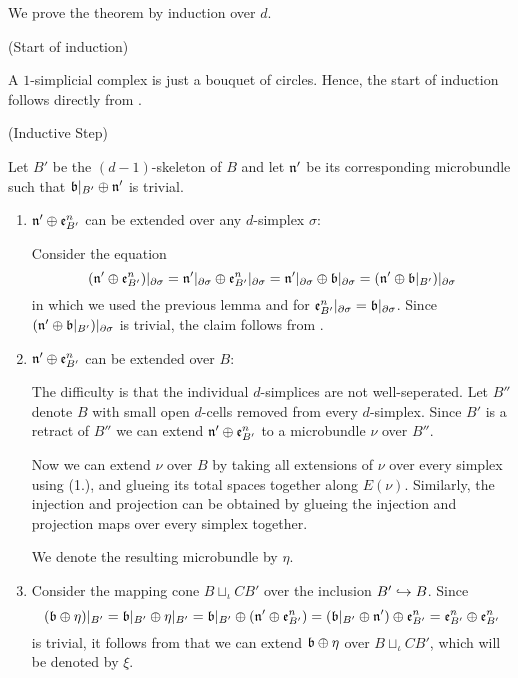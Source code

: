 \begin{myproof}
    We prove the theorem by induction over $d$.

    (Start of induction)

    A $1$-simplicial complex is just a bouquet of circles.
    Hence, the start of induction follows directly from .   

    (Inductive Step)

    Let $B'$ be the $(d - 1)$-skeleton of $B$ and let $\mathfrak{n}'$ be its corresponding microbundle
    such that $\whitney{\bb[B']}{\bn'}$ is trivial.

    \begin{enumerate}
        \item $\mathfrak{n}' \oplus{} \mathfrak{e}^{n}_{B'}$ can be extended over any $d$-simplex $\sigma$:

        Consider the equation
        \[
            (\whitney{\bn'}{\be{B'}})\restr{\partial\sigma}
            = \whitney{\bn'\restr{\partial\sigma}}{\be{B'}\restr{\partial\sigma}}
            = \whitney{\bn'\restr{\partial\sigma}}{\bb[\partial\sigma]}
            = (\whitney{\bn'}{\bb[B']})\restr{\partial\sigma}
        \]
        in which we used the previous lemma and 
        for $\be{B'}\restr{\partial\sigma} = \bb[\partial\sigma]$.
        Since $(\whitney{\bn'}{\bb[B']})\restr{\partial\sigma}$ is trivial, the claim follows from .

        \item $\mathfrak{n}' \oplus{} \mathfrak{e}^{n}_{B'}$ can be extended over $B$:

        The difficulty is that the individual $d$-simplices are not well-seperated.
        Let $B''$ denote $B$ with small open $d$-cells removed from every $d$-simplex.
        Since $B'$ is a retract of $B''$ we can extend $\mathfrak{n}' \oplus{} \mathfrak{e}^{n}_{B'}$ to a microbundle $\nu$ over $B''$.

        Now we can extend $\nu$ over $B$ by taking all extensions of $\nu$
        over every simplex
        using (1.), and glueing its total spaces together along $E(\nu)$.
        Similarly, the injection and projection can be obtained
        by glueing the injection and projection maps over every simplex together.

        We denote the resulting microbundle by $\eta$.

        \item
        Consider the mapping cone $B \sqcup_\iota CB'$ over the inclusion $B' \hookrightarrow{} B$.
        Since
        \[
            (\whitney{\bb}{\eta})\restr{B'}
            = \whitney{\bb[B']}{\eta\restr{B'}}
            = \whitney{\bb[B']}{(\whitney{\bn'}{\be{B'}})}
            = \whitney{(\whitney{\bb[B']}{\bn'})}{\be{B'}}
            = \whitney{\be{B'}}{\be{B'}}
        \]
        is trivial, it follows from  that
        we can extend $\whitney{\bb}{\eta}$ over $B \sqcup_\iota CB'$,
        which will be denoted by $\xi$.


\end{enumerate}
\end{myproof}
